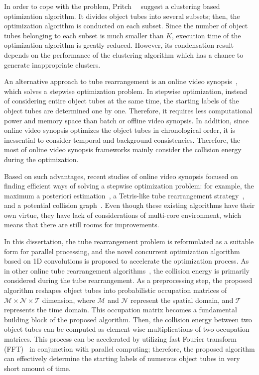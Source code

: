 \documentclass[11pt]{hyu_thesis}
\begin{document}
In order to cope with the problem, Pritch~\etal~\cite{Pritch2009} suggest
a clustering based optimization algorithm. It divides object tubes into several subsets; then, the optimization algorithm is conducted on each subset. Since the number of object tubes belonging to each subset is much smaller than $K$, execution time of the optimization algorithm is greatly reduced. However, its condensation result depends on the performance of the clustering algorithm which has a chance to
generate inappropriate clusters.

An alternative approach to tube rearrangement is an online video synopsis~\cite{Huang2014,Feng2012,Zhu2015,He2017,Fu2014}, which solves a stepwise optimization problem. In stepwise optimization, instead of considering entire object tubes at the same time, the starting labels of the object tubes are determined one by one. Therefore, it requires less computational power and memory space than batch or offline video synopsis. In addition, since online video synopsis optimizes the object tubes in chronological order, it is inessential to consider temporal and background consistencies. Therefore, the most of online video synopsis frameworks mainly consider the collision energy during the optimization.

Based on such advantages, recent studies of online video synopsis focused on finding efficient ways of solving a stepwise optimization problem: for example, the maximum a posteriori estimation~\cite{Huang2014}, a Tetris-like tube rearrangement strategy~\cite{Feng2012,Zhu2015}, and a potential collision graph~\cite{He2017}. 
Even though these existing algorithms have their own virtue, they have lack of considerations of multi-core environment, which means that there are still rooms for improvements.

In this dissertation, the tube rearrangement problem is reformulated as a suitable form for parallel processing, and the novel concurrent optimization algorithm based on 1D convolutions is proposed to accelerate the optimization process. As in other online tube rearrangement algorithms~\cite{Huang2014,Feng2012,Zhu2015,He2017,Fu2014}, the collision energy is primarily considered during the tube rearrangement. As a preprocessing step, the proposed algorithm reshapes object tubes into probabilistic occupation matrices of $\mathcal{M} \times \mathcal{N} \times \mathcal{T}$ dimension, where $\mathcal{M}$ and $\mathcal{N}$ represent the spatial domain, and $\mathcal{T}$ represents the time domain. This occupation matrix becomes a fundamental building block of the proposed algorithm. Then, the collision energy between two object tubes can be computed as element-wise multiplications of two occupation matrices. This process can be accelerated by utilizing fast Fourier transform (FFT)~\cite{Oppenheim2009} in conjunction with parallel computing; therefore, the proposed algorithm can effectively determine the starting labels of numerous object tubes in very short amount of time.
\end{document}
